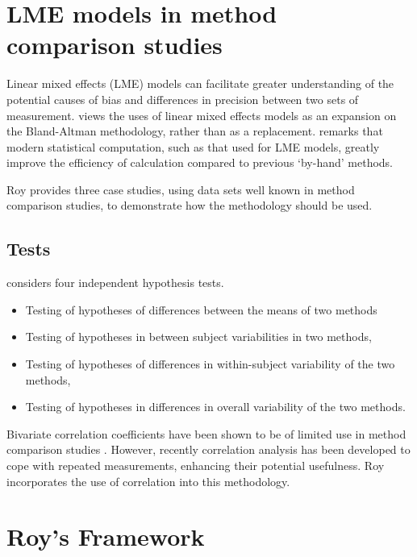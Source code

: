 

\section{LME models in method comparison studies}

Linear mixed effects (LME) models can facilitate greater understanding of the potential causes of bias and differences in precision between two sets of measurement. \citet{LaiShiao} views the uses of linear mixed effects models as an expansion on the Bland-Altman methodology, rather than as a replacement. \citet{BXC2008} remarks that modern statistical computation, such as that used for LME models, greatly improve the efficiency of calculation compared to previous `by-hand' methods. 

Roy provides three case studies, using data sets well known in method comparison studies, to demonstrate how the methodology should be used.

\subsection{Tests}
\citet{ARoy2009} considers four independent hypothesis tests.
\begin{itemize}
\item Testing of hypotheses of differences between the means of
two methods\item Testing of hypotheses in between subject
variabilities in two methods, \item Testing of hypotheses of
differences in within-subject variability of the two methods,
\item Testing of hypotheses in differences in overall variability
of the two methods.
\end{itemize}

Bivariate correlation coefficients have been shown to be of limited use in method comparison studies \citep{BA86}. However, recently correlation analysis has been developed to cope with repeated measurements, enhancing their potential usefulness. Roy
incorporates the use of correlation into this methodology.



\section{Roy's Framework}

